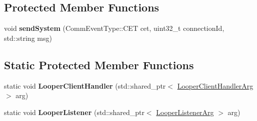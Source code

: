 \subsection*{Protected Member Functions}
\begin{DoxyCompactItemize}
\item 
\hypertarget{classbali_1_1_comm_aaee60040345e4fd5d24615d4c0bf4ba8}{void {\bfseries send\-System} (Comm\-Event\-Type\-::\-C\-E\-T cet, uint32\-\_\-t connection\-Id, std\-::string msg)}\label{classbali_1_1_comm_aaee60040345e4fd5d24615d4c0bf4ba8}

\end{DoxyCompactItemize}
\subsection*{Static Protected Member Functions}
\begin{DoxyCompactItemize}
\item 
\hypertarget{classbali_1_1_comm_a973b2b3e8f10efbb3bdf3fe92b7d2a77}{static void {\bfseries Looper\-Client\-Handler} (std\-::shared\-\_\-ptr$<$ \hyperlink{structbali_1_1_looper_client_handler_arg}{Looper\-Client\-Handler\-Arg} $>$ arg)}\label{classbali_1_1_comm_a973b2b3e8f10efbb3bdf3fe92b7d2a77}

\item 
\hypertarget{classbali_1_1_comm_aafc2bc3e63415c465b28604746101daf}{static void {\bfseries Looper\-Listener} (std\-::shared\-\_\-ptr$<$ \hyperlink{structbali_1_1_looper_listener_arg}{Looper\-Listener\-Arg} $>$ arg)}\label{classbali_1_1_comm_aafc2bc3e63415c465b28604746101daf}

\end{DoxyCompactItemize}
